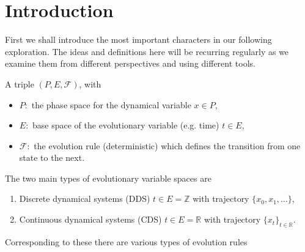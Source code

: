\chapter{Introduction}
First we shall introduce the most important characters in our following exploration. The ideas and definitions here will be recurring regularly as we examine them from different perspectives and using different tools.

\begin{definition}
	A triple $(P,E, \mathcal{F})$, with
	\begin{itemize}
		\item $P :$ the phase space for the dynamical variable $x\in P$,
		\item  $E:$ base space of the evolutionary variable (e.g. time) $t \in E$,
		\item $\mathcal{F}: $ the evolution rule (deterministic) which defines the transition from one state to the next.
\end{itemize}
\end{definition}
The two main types of evolutionary variable spaces are
\begin{enumerate}
	\item Discrete dynamical systems (DDS) $t\in E=\mathbb{Z}$ with trajectory $\{x_0, x_1, \ldots\}$,
	\item Continuous dynamical systems (CDS) $t\in E=\mathbb{R}$ with trajectory $\{x_t\}_{t \in \mathbb{R}}$.
\end{enumerate}
Corresponding to these there are various types of evolution rules
